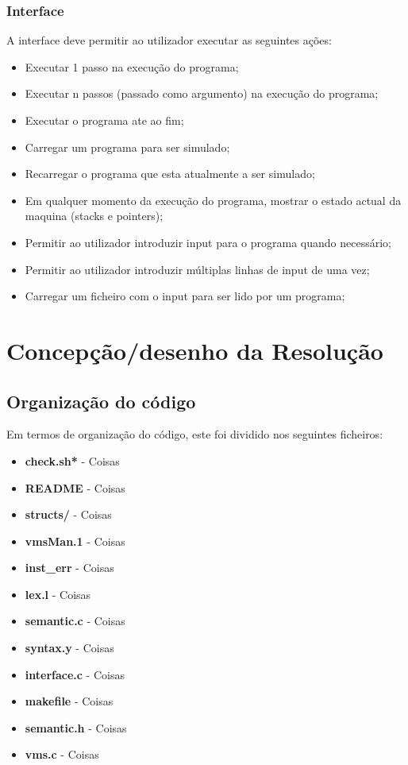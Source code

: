 \documentclass{report}
\begin{document}
\subsection{Interface}
\quad A interface deve permitir ao utilizador executar as seguintes ações:
\begin{itemize}
\item Executar 1 passo na execução do programa;
\item Executar n passos (passado como argumento) na execução do programa;
\item Executar o programa ate ao fim;
\item Carregar um programa para ser simulado;
\item Recarregar o programa que esta atualmente a ser simulado;
\item Em qualquer momento da execução do programa, mostrar o estado actual da maquina (stacks e pointers);
\item Permitir ao utilizador introduzir input para o programa quando necessário;
\item Permitir ao utilizador introduzir múltiplas linhas de input de uma vez;
\item Carregar um ficheiro com o input para ser lido por um programa;
\end{itemize}

\chapter{Concepção/desenho da Resolução}
\section{Organização do código}

Em termos de organização do código, este foi dividido nos seguintes ficheiros:

\begin{itemize}
\item \textbf{check.sh*} - Coisas
\item \textbf{README} - Coisas
\item \textbf{structs/} - Coisas
\item \textbf{vmsMan.1} - Coisas
\item \textbf{inst\_err} - Coisas
\item \textbf{lex.l} - Coisas
\item \textbf{semantic.c} - Coisas
\item \textbf{syntax.y} - Coisas
\item \textbf{interface.c} - Coisas
\item \textbf{makefile} - Coisas
\item \textbf{semantic.h} - Coisas
\item \textbf{vms.c} - Coisas
\end{itemize}
\end{document}
